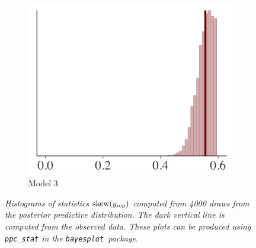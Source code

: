 \documentclass{statsoc}
\newcommand{\bayesplot}{{\tt bayesplot}}
\begin{document}
\begin{figure}
\begin{subfigure}{0.31\textwidth}
\includegraphics[width=\textwidth]{ppc_skew3.png}
\caption{Model 3}
\label{fig:ppc_skew3}
\end{subfigure}

\caption{\it Histograms of statistics ${\rm skew}{(y_{\rm rep})}$
computed from 4000 draws from the posterior predictive distribution. The dark
vertical line is computed from the observed data. These plots can be produced
using {\tt ppc\_stat} in the \bayesplot\ package.}
\label{fig:ppc_skew}
\end{figure}
\end{document}
